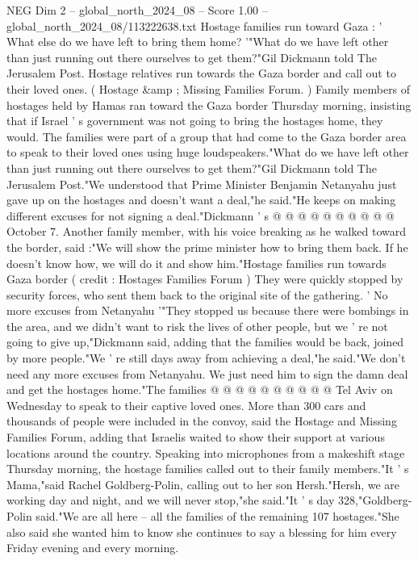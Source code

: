 \begin{textsample}{NEG Dim 2 – global\_north\_2024\_08 – Score 1.00 – global\_north\_2024\_08/113222638.txt}  \label{ex:f2_neg_359}
Hostage families run toward Gaza : ' What else do we have left to bring them home? '"What do we have left other than just running out there ourselves to get them?"Gil Dickmann told The Jerusalem Post.
Hostage relatives run towards the Gaza border and call out to their loved ones. ( Hostage \&amp ; Missing Families Forum. ) Family members of hostages held by Hamas ran toward the Gaza border Thursday morning, insisting that if Israel ' s government was not going to bring the hostages home, they would.
The families were part of a group that had come to the Gaza border area to speak to their loved ones using huge loudspeakers."What do we have left other than just running out there ourselves to get them?"Gil Dickmann told The Jerusalem Post."We understood that Prime Minister Benjamin Netanyahu just gave up on the hostages and doesn't want a deal,"he said."He keeps on making different excuses for not signing a deal."Dickmann ' s @ @ @ @ @ @ @ @ @ @ October 7.
Another family member, with his voice breaking as he walked toward the border, said :"We will show the prime minister how to bring them back.
If he doesn't know how, we will do it and show him."Hostage families run towards Gaza border ( credit : Hostages Families Forum ) They were quickly stopped by security forces, who sent them back to the original site of the gathering. ' No more excuses from Netanyahu '"They stopped us because there were bombings in the area, and we didn't want to risk the lives of other people, but we ' re not going to give up,"Dickmann said, adding that the families would be back, joined by more people."We ' re still days away from achieving a deal,"he said."We don't need any more excuses from Netanyahu.
We just need him to sign the damn deal and get the hostages home."The families @ @ @ @ @ @ @ @ @ @ Tel Aviv on Wednesday to speak to their captive loved ones.
More than 300 cars and thousands of people were included in the convoy, said the Hostage and Missing Families Forum, adding that Israelis waited to show their support at various locations around the country.
Speaking into microphones from a makeshift stage Thursday morning, the hostage families called out to their family members."It ' s Mama,"said Rachel Goldberg-Polin, calling out to her son Hersh."Hersh, we are working day and night, and we will never stop,"she said."It ' s day 328,"Goldberg-Polin said."We are all here -- all the families of the remaining 107 hostages."She also said she wanted him to know she continues to say a blessing for him every Friday evening and every morning.

\end{textsample}
